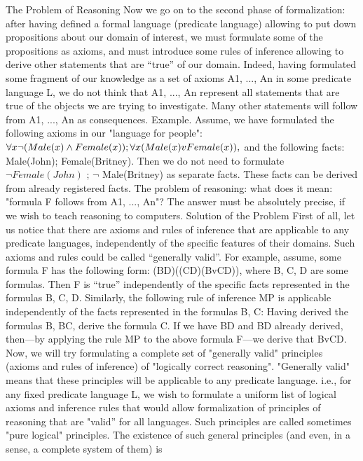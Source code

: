 The Problem of Reasoning
Now we go on to the second phase of formalization: after having defined a formal language (predicate
language) allowing to put down propositions about our domain of interest, we must formulate some of the
propositions as axioms, and must introduce some rules of inference allowing to derive other statements
that are ``true'' of our domain.
Indeed, having formulated some fragment of our knowledge as a set of axioms A1, ..., An in some
predicate language L, we do not think that A1, ..., An represent all statements that are true of the objects
we are trying to investigate. Many other statements will follow from A1, ..., An as consequences.
Example. Assume, we have formulated the following axioms in our "language for people":
\(\forall x\neg (Male(x)\wedge Female(x)); \forall x(Male(x)vFemale(x)),\) and the following facts: Male(John);
Female(Britney). Then we do not need to formulate \(\neg Female(John)\) ; \(\neg\) Male(Britney) as separate facts.
These facts can be derived from already registered facts.
The problem of reasoning: what does it mean: "formula F follows from A1, ..., An"? The answer must be
absolutely precise, if we wish to teach reasoning to computers.
Solution of the Problem
First of all, let us notice that there are axioms and rules of inference that are applicable to any predicate
languages, independently of the specific features of their domains. Such axioms and rules could be called
``generally valid''.
For example, assume, some formula F has the following form:
(B\IMPLIES D)\IMPLIES ((C\IMPLIES D)\IMPLIES (BvC\IMPLIES D)),
where B, C, D are some formulas. Then F is ``true'' independently of the specific facts represented in the
formulas B, C, D.
Similarly, the following rule of inference MP is applicable independently of the facts represented in the
formulas B, C:
Having derived the formulas B, B\IMPLIES C, derive the formula C.
If we have B\IMPLIES D and B\IMPLIES D already derived, then---by applying the rule MP to the above formula F---we
derive that BvC\IMPLIES D.
Now, we will try formulating a complete set of "generally valid" principles (axioms and rules of
inference) of "logically correct reasoning". "Generally valid" means that these principles will be
applicable to any predicate language. i.e., for any fixed predicate language L, we wish to formulate a
uniform list of logical axioms and inference rules that would allow formalization of principles of
reasoning that are "valid'' for all languages. Such principles are called sometimes "pure logical"
principles. The existence of such general principles (and even, in a sense, a complete system of them) is
